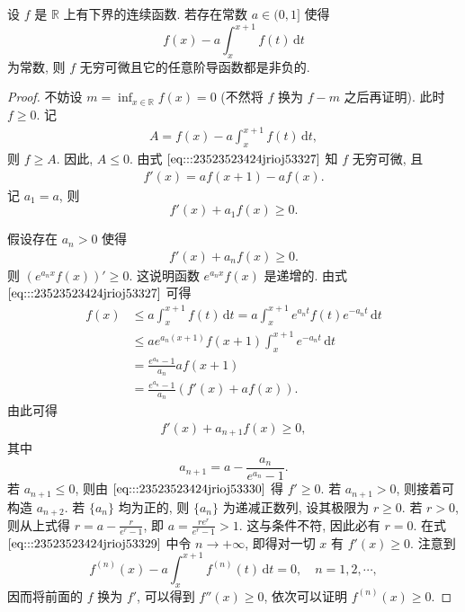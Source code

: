 \documentclass[../../main.tex]{subfiles}
\begin{document}
\begin{example}
设 \( f \) 是 \( \mathbb{R} \) 上有下界的连续函数. 若存在常数 \( a \in (0,1] \) 使得  
\[
f(x) - a \int_{x}^{x + 1} f(t) \, \mathrm{d}t
\]  
为常数, 则 \( f \) 无穷可微且它的任意阶导函数都是非负的.  
\end{example}
\begin{proof}
不妨设 \( m = \inf_{x \in \mathbb{R}} f(x) = 0 \) (不然将 \( f \) 换为 \( f - m \) 之后再证明). 此时 \( f \geqslant 0 \). 记  
\begin{align}
A = f(x) - a \int_{x}^{x + 1} f(t) \, \mathrm{d}t, \label{eq:::23523523424jrioj53327}
\end{align}
则 \( f \geqslant A \). 因此, \( A \leqslant 0 \). 由式 \(\eqref{eq:::23523523424jrioj53327}\) 知 \( f \) 无穷可微, 且  
\begin{align}
f'(x) = a f(x + 1) - a f(x). \label{eq:::23523523424jrioj53328}
\end{align}  
记 \( a_1 = a \), 则  
\[
f'(x) + a_1 f(x) \geqslant 0.
\]  

假设存在 \( a_n > 0 \) 使得  
\begin{align}
f'(x) + a_n f(x) \geqslant 0. \label{eq:::23523523424jrioj53329}
\end{align}  
则 \( (e^{a_n x} f(x))' \geqslant 0 \). 这说明函数 \( e^{a_n x} f(x) \) 是递增的. 由式 \(\eqref{eq:::23523523424jrioj53327}\) 可得  
\[
\begin{aligned}
f(x) &\leqslant a \int_{x}^{x + 1} f(t) \, \mathrm{d}t = a \int_{x}^{x + 1} e^{a_n t} f(t) e^{-a_n t} \, \mathrm{d}t \\
&\leqslant a e^{a_n (x + 1)} f(x + 1) \int_{x}^{x + 1} e^{-a_n t} \, \mathrm{d}t \\
&= \frac{e^{a_n} - 1}{a_n} a f(x + 1) \\
&= \frac{e^{a_n} - 1}{a_n} (f'(x) + a f(x)).
\end{aligned}
\]  
由此可得  
\begin{align}
f'(x) + a_{n + 1} f(x) \geqslant 0, \label{eq:::23523523424jrioj53330}
\end{align}  
其中  
\[
a_{n + 1} = a - \frac{a_n}{e^{a_n} - 1}.
\]  
若 \( a_{n + 1} \leqslant 0 \), 则由 \(\eqref{eq:::23523523424jrioj53330}\) 得 \( f' \geqslant 0 \). 若 \( a_{n + 1} > 0 \), 则接着可构造 \( a_{n + 2} \). 若 \( \{a_n\} \) 均为正的, 则 \( \{a_n\} \) 为递减正数列, 设其极限为 \( r \geqslant 0 \). 若 \( r > 0 \), 则从上式得 \( r = a - \frac{r}{e^r - 1} \), 即 \( a = \frac{r e^r}{e^r - 1} > 1 \). 这与条件不符, 因此必有 \( r = 0 \). 在式 \(\eqref{eq:::23523523424jrioj53329}\) 中令 \( n \to +\infty \), 即得对一切 \( x \) 有 \( f'(x) \geqslant 0 \). 注意到  
\[
f^{(n)}(x) - a \int_{x}^{x + 1} f^{(n)}(t) \, \mathrm{d}t = 0, \quad n = 1, 2, \cdots,
\]  
因而将前面的 \( f \) 换为 \( f' \), 可以得到 \( f''(x) \geqslant 0 \), 依次可以证明 \( f^{(n)}(x) \geqslant 0 \).

\end{proof}
\end{document}
